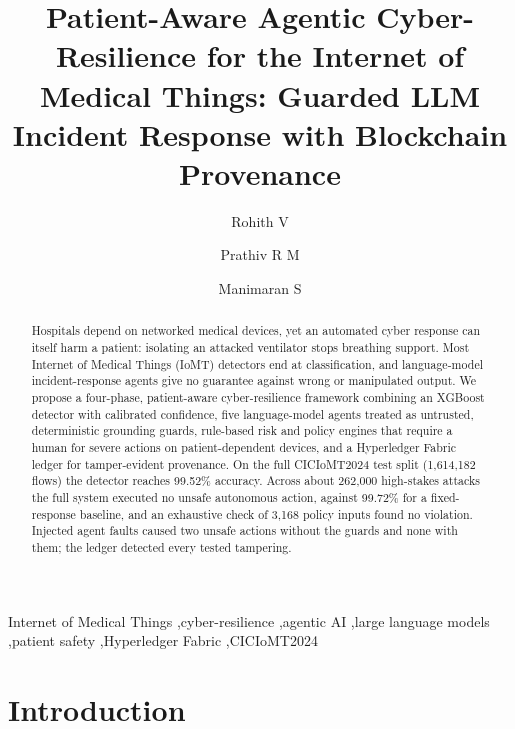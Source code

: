 \documentclass[preprint,12pt]{elsarticle}
\begin{document}
\begin{frontmatter}

\title{Patient-Aware Agentic Cyber-Resilience for the Internet of Medical Things:
Guarded LLM Incident Response with Blockchain Provenance}

\author[aff1]{Rohith V}
\author[aff1]{Prathiv R M}
\author[aff1]{Manimaran S}
\address[aff1]{Amrita School of Artificial Intelligence, Coimbatore, Amrita Vishwa Vidyapeetham, India}

\begin{abstract}
Hospitals depend on networked medical devices, yet an automated cyber response can itself harm a patient: isolating an attacked ventilator stops breathing support. Most Internet of Medical Things (IoMT) detectors end at classification, and language-model incident-response agents give no guarantee against wrong or manipulated output. We propose a four-phase, patient-aware cyber-resilience framework combining an XGBoost detector with calibrated confidence, five language-model agents treated as untrusted, deterministic grounding guards, rule-based risk and policy engines that require a human for severe actions on patient-dependent devices, and a Hyperledger Fabric ledger for tamper-evident provenance. On the full CICIoMT2024 test split (1,614,182 flows) the detector reaches 99.52\% accuracy. Across about 262,000 high-stakes attacks the full system executed no unsafe autonomous action, against 99.72\% for a fixed-response baseline, and an exhaustive check of 3,168 policy inputs found no violation. Injected agent faults caused two unsafe actions without the guards and none with them; the ledger detected every tested tampering.
\end{abstract}

\begin{keyword}
Internet of Medical Things \sep cyber-resilience \sep agentic AI \sep large language models \sep patient safety \sep Hyperledger Fabric \sep CICIoMT2024
\end{keyword}

\end{frontmatter}

\section{Introduction}
\label{sec:intro}
\end{document}
